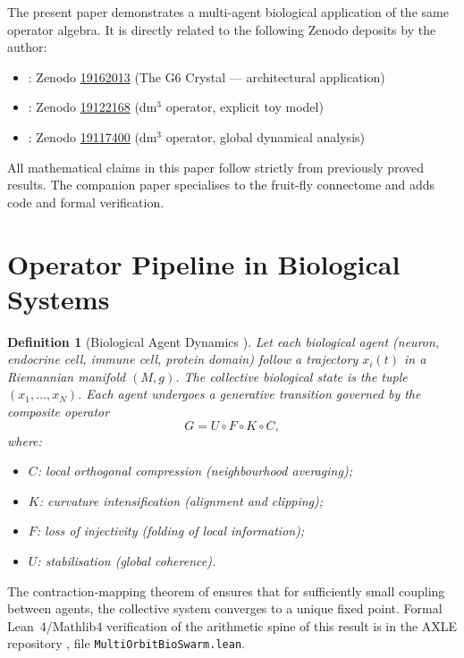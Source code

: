 \documentclass[12pt,a4paper]{article}
\newtheorem{definition}{Definition}
\begin{document}
The present paper demonstrates a multi-agent biological application
of the same operator algebra. It is directly related to the following
Zenodo deposits by the author:
\begin{itemize}[leftmargin=2em, itemsep=1pt]
  \item \cite{Grossi2026_Crystal}:
    Zenodo \href{https://doi.org/10.5281/zenodo.19162013}{19162013}
    (The G6 Crystal --- architectural application)
  \item \cite{Grossi2026_DM3b}:
    Zenodo \href{https://doi.org/10.5281/zenodo.19122168}{19122168}
    (dm$^3$ operator, explicit toy model)
  \item \cite{Grossi2026_DM3}:
    Zenodo \href{https://doi.org/10.5281/zenodo.19117400}{19117400}
    (dm$^3$ operator, global dynamical analysis)
\end{itemize}
All mathematical claims in this paper follow strictly from previously
proved results. The companion paper \cite{Grossi2026_FruitFly}
specialises to the fruit-fly connectome and adds code and formal
verification.

\section{Operator Pipeline in Biological Systems}
\label{sec:pipeline}

\begin{definition}[Biological Agent Dynamics {\cite{Grossi2026_Vol1}}]
\label{def:agent}
Let each biological agent (neuron, endocrine cell, immune cell,
protein domain) follow a trajectory $x_{i}(t)$ in a Riemannian
manifold $(M,g)$. The collective biological state is the tuple
$(x_{1},\ldots,x_{N})$. Each agent undergoes a generative transition
governed by the composite operator
\[
  G = U \circ F \circ K \circ C,
\]
where:
\begin{itemize}[leftmargin=2em, itemsep=2pt]
  \item $C$: local orthogonal compression (neighbourhood averaging);
  \item $K$: curvature intensification (alignment and clipping);
  \item $F$: loss of injectivity (folding of local information);
  \item $U$: stabilisation (global coherence).
\end{itemize}
\end{definition}

The contraction-mapping theorem of \cite{Grossi2026_Vol1} ensures
that for sufficiently small coupling between agents, the collective
system converges to a unique fixed point. Formal Lean~4/Mathlib4
verification of the arithmetic spine of this result is in the AXLE
repository \cite{AXLE2026}, file \texttt{MultiOrbitBioSwarm.lean}.
\end{document}
